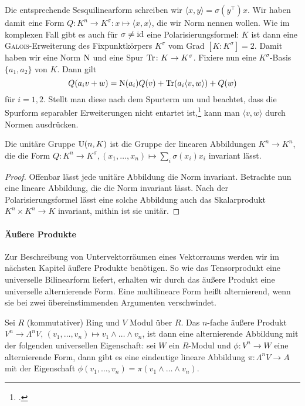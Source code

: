 Die entsprechende Sesquilinearform schreiben wir $\langle x, y \rangle = \sigma(y^\top) x$. Wir haben damit eine Form $Q: K^n \to K^\sigma: x \mapsto \langle x, x \rangle$, die wir Norm nennen wollen. Wie im komplexen Fall gibt es auch für $\sigma \neq \operatorname{id}$ eine Polarisierungsformel: $K$ ist dann eine \textsc{Galois}-Erweiterung des Fixpunktkörpers $K^\sigma$ vom Grad $[K:K^\sigma] = 2$. Damit haben wir eine Norm $\operatorname{N}$ und eine Spur $\operatorname{Tr} \colon K \rightarrow K^\sigma$. Fixiere nun eine $K^\sigma$-Basis $\{a_1, a_2\}$ von $K$. Dann gilt
\begin{equation*}
Q(a_i v + w) = \operatorname{N}(a_i) Q(v) + \operatorname{Tr}(a_i \langle v, w \rangle) + Q(w)
\end{equation*}
für $i = 1,2$. Stellt man diese nach dem Spurterm um und beachtet, dass die Spurform separabler Erweiterungen nicht entartet ist,\footcite[S.~199, Satz~7]{Bosch} kann man $\langle v, w \rangle$ durch Normen ausdrücken.
\begin{fact} \label{fact:norminv}
Die unitäre Gruppe $\mathbb U(n,K)$ ist die Gruppe der linearen Abbildungen $K^n \to K^n$, die die Form $Q: K^n \to K^\sigma, (x_1, \dots, x_n) \mapsto \sum_i \sigma(x_i) x_i$ invariant lässt.
\end{fact}
\begin{proof}
Offenbar lässt jede unitäre Abbildung die Norm invariant. Betrachte nun eine lineare Abbildung, die die Norm invariant lässt. Nach der Polarisierungsformel lässt eine solche Abbildung auch das Skalarprodukt $K^n \times K^n \to K$ invariant, mithin ist sie unitär.
\end{proof}

\paragraph{Äußere Produkte} Zur Beschreibung von Untervektorräumen eines Vektorraums werden wir im nächsten Kapitel äußere Produkte benötigen. So wie das Tensorprodukt eine universelle Bilinearform liefert, erhalten wir durch das äußere Produkt eine universelle alternierende Form. Eine multilineare Form heißt alternierend, wenn sie bei zwei übereinstimmenden Argumenten verschwindet.

\begin{defin}
Sei $R$ (kommutativer) Ring und $V$ Modul über $R$. Das $n$-fache äußere Produkt $V^n \to \Lambda^n V$, $(v_1, \dots, v_n) \mapsto v_1 \wedge \dots \wedge v_n$, ist dann eine alternierende Abbildung mit der folgenden universellen Eigenschaft: sei $W$ ein $R$-Modul und $\phi: V^n \to W$ eine alternierende Form, dann gibt es eine eindeutige lineare Abbildung $\pi: \Lambda^n V \to A$ mit der Eigenschaft $\phi(v_1, \dots, v_n) = \pi(v_1 \wedge \dots \wedge v_n)$.
\end{defin}

